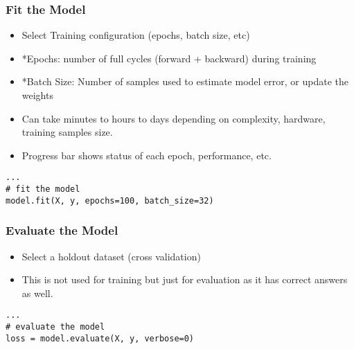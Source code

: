 \begin{frame}[fragile] \frametitle{Fit the Model}

\begin{itemize}
\item Select Training configuration (epochs, batch size, etc)
\item *Epochs: number of full cycles (forward + backward) during training
\item *Batch Size: Number of samples used to estimate model error, or update the weights
\item Can take minutes to hours to days depending on complexity, hardware, training samples size.
\item Progress bar shows status of each epoch, performance, etc.
\end{itemize}

\begin{lstlisting}
...
# fit the model
model.fit(X, y, epochs=100, batch_size=32)
\end{lstlisting}
\end{frame}

\begin{frame}[fragile] \frametitle{Evaluate the Model}

\begin{itemize}
\item Select a holdout dataset (cross validation)
\item This is not used for training but just for evaluation as it has correct answers as well.
\end{itemize}

\begin{lstlisting}
...
# evaluate the model
loss = model.evaluate(X, y, verbose=0)
\end{lstlisting}
\end{frame}

